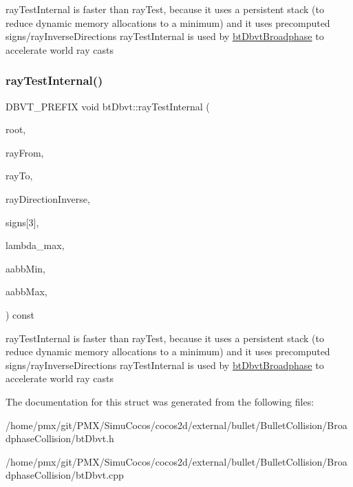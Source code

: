 ray\+Test\+Internal is faster than ray\+Test, because it uses a persistent stack (to reduce dynamic memory allocations to a minimum) and it uses precomputed signs/ray\+Inverse\+Directions ray\+Test\+Internal is used by \hyperlink{structbtDbvtBroadphase}{bt\+Dbvt\+Broadphase} to accelerate world ray casts \mbox{\label{structbtDbvt_a0704881c8799d5326308a6bf210fdfd3}} 
\subsubsection{\texorpdfstring{ray\+Test\+Internal()}{rayTestInternal()}\hspace{0.1cm}{\footnotesize\ttfamily [2/2]}}
{\footnotesize\ttfamily D\+B\+V\+T\+\_\+\+P\+R\+E\+F\+IX void bt\+Dbvt\+::ray\+Test\+Internal (\begin{DoxyParamCaption}\item[{const \hyperlink{structbtDbvtNode}{bt\+Dbvt\+Node} $\ast$}]{root,  }\item[{const bt\+Vector3 \&}]{ray\+From,  }\item[{const bt\+Vector3 \&}]{ray\+To,  }\item[{const bt\+Vector3 \&}]{ray\+Direction\+Inverse,  }\item[{unsigned int}]{signs\mbox{[}3\mbox{]},  }\item[{bt\+Scalar}]{lambda\+\_\+max,  }\item[{const bt\+Vector3 \&}]{aabb\+Min,  }\item[{const bt\+Vector3 \&}]{aabb\+Max,  }\item[{D\+B\+V\+T\+\_\+\+I\+P\+O\+L\+I\+CY}]{ }\end{DoxyParamCaption}) const\hspace{0.3cm}{\ttfamily [inline]}}

ray\+Test\+Internal is faster than ray\+Test, because it uses a persistent stack (to reduce dynamic memory allocations to a minimum) and it uses precomputed signs/ray\+Inverse\+Directions ray\+Test\+Internal is used by \hyperlink{structbtDbvtBroadphase}{bt\+Dbvt\+Broadphase} to accelerate world ray casts 

The documentation for this struct was generated from the following files\+:\begin{DoxyCompactItemize}
\item 
/home/pmx/git/\+P\+M\+X/\+Simu\+Cocos/cocos2d/external/bullet/\+Bullet\+Collision/\+Broadphase\+Collision/bt\+Dbvt.\+h\item 
/home/pmx/git/\+P\+M\+X/\+Simu\+Cocos/cocos2d/external/bullet/\+Bullet\+Collision/\+Broadphase\+Collision/bt\+Dbvt.\+cpp\end{DoxyCompactItemize}
